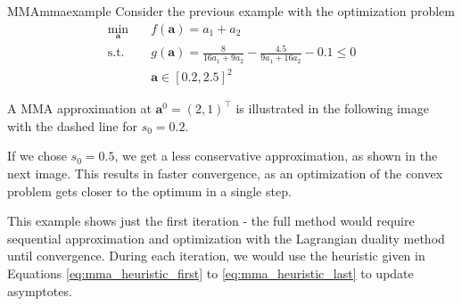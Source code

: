 \begin{example}{MMA}{mmaexample}
    Consider the previous example with the optimization problem
    \begin{equation}
        \begin{aligned}
            \min_{\mathbf{a}} \quad & f(\mathbf{a})= a_1 + a_2\\
            \textrm{s.t.} \quad     & g(\mathbf{a}) = \frac{8}{16a_1+9a_2} - \frac{4.5}{9a_1+16a_2} -0.1 \le 0  \\
            \quad     & \mathbf{a} \in [0.2,2.5]^2
        \end{aligned}
    \end{equation}

    A MMA approximation at $\mathbf{a}^0=(2,1)^\top$ is illustrated in the following image with the dashed line for $s_0=0.2$. 
    \begin{center}
        
    \end{center}

    If we chose $s_0=0.5$, we get a less conservative approximation, as shown in the next image. This results in faster convergence, as an optimization of the convex problem gets closer to the optimum in a single step.
    \begin{center}
        
    \end{center}

    This example shows just the first iteration - the full method would require sequential approximation and optimization with the Lagrangian duality method until convergence. During each iteration, we would use the heuristic given in Equations \eqref{eq:mma_heuristic_first} to \eqref{eq:mma_heuristic_last} to update asymptotes.  
\end{example}


 
